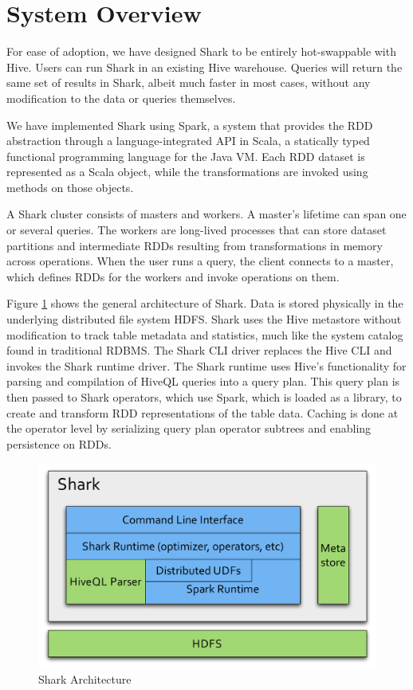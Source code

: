 \section{System Overview}

For ease of adoption, we have designed Shark to be entirely hot-swappable with Hive. Users can run Shark in an existing Hive warehouse. Queries will return the same set of results in Shark, albeit much faster in most cases, without any modification to the data or queries themselves.

We have implemented Shark using Spark, a system that provides the RDD abstraction through a language-integrated API in Scala, a statically typed functional programming language for the Java VM. Each RDD dataset is represented as a Scala object, while the transformations are invoked using methods on those objects. 

A Shark cluster consists of masters and workers. A master's lifetime can span one or several queries. The workers are long-lived processes that can store dataset partitions and intermediate RDDs resulting from transformations in memory across operations. When the user runs a query, the client connects to a master, which defines RDDs for the workers and invoke operations on them. %

Figure \ref{fig:arch} shows the general architecture of Shark. Data is stored physically in the underlying distributed file system HDFS. Shark uses the Hive metastore without modification to track table metadata and statistics, much like the system catalog found in traditional RDBMS. The Shark CLI driver replaces the Hive CLI and invokes the Shark runtime driver. The Shark runtime uses Hive's functionality for parsing and compilation of HiveQL queries into a query plan. This query plan is then passed to Shark operators, which use Spark, which is loaded as a library, to create and transform RDD representations of the table data. Caching is done at the operator level by serializing query plan operator subtrees and enabling persistence on RDDs.

\begin{figure}[t]
	\centering
	\includegraphics[width=\linewidth]{files/architecture.pdf}
	\caption{Shark Architecture}
	\label{fig:arch}
\end{figure}
